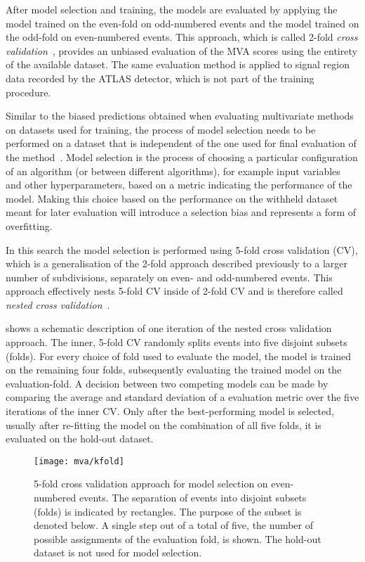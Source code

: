 After model selection and training, the models are evaluated by
applying the model trained on the even-fold on odd-numbered events and
the model trained on the odd-fold on even-numbered events. This
approach, which is called 2-fold \emph{cross
  validation}~\cite{hastie09,bishop06}, provides an unbiased
evaluation of the MVA scores using the entirety of the available
dataset. The same evaluation method is applied to signal region data
recorded by the ATLAS detector, which is not part of the training
procedure.

Similar to the biased predictions obtained when evaluating
multivariate methods on datasets used for training, the process of
model selection needs to be performed on a dataset that is independent
of the one used for final evaluation of the
method~\cite{cawley10}. Model selection is the process of choosing a
particular configuration of an algorithm (or between different
algorithms), for example input variables and other hyperparameters,
based on a metric indicating the performance of the model. Making this
choice based on the performance on the withheld dataset meant for
later evaluation will introduce a selection bias and represents a form
of overfitting.

In this search the model selection is performed using 5-fold cross
validation (CV), which is a generalisation of the 2-fold approach
described previously to a larger number of subdivisions, separately on
even- and odd-numbered events. This approach effectively nests
5-fold CV inside of 2-fold CV and is therefore called
\emph{nested cross validation}~\cite{cawley10,stone74}.

 shows a schematic description of one
iteration of the nested cross validation approach. The inner, 5-fold
CV randomly splits events into five disjoint subsets (folds). For
every choice of fold used to evaluate the model, the model is trained
on the remaining four folds, subsequently evaluating the trained model
on the evaluation-fold. A decision between two competing models can be
made by comparing the average and standard deviation of a evaluation
metric over the five iterations of the inner CV. Only after the
best-performing model is selected, usually after re-fitting the model
on the combination of all five folds, it is evaluated on the hold-out
dataset.

\begin{figure}[htbp]
  \centering

  \texttt{[image: mva/kfold]}

  \caption{5-fold cross validation approach for model selection on
    even-numbered events. The separation of events into disjoint
    subsets (folds) is indicated by rectangles. The purpose of the
    subset is denoted below. A single step out of a total of five, the
    number of possible assignments of the evaluation fold, is
    shown. The hold-out dataset is not used for model selection.}
  \label{fig:cross_validation}
\end{figure}


